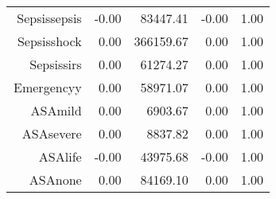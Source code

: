 \begin{tabular}{rrrrr}
$$  Sepsis\-sepsis & -0.00 & 83447.41 & -0.00 & 1.00 \\ 
  Sepsis\-shock & 0.00 & 366159.67 & 0.00 & 1.00 \\ 
  Sepsis\-sirs & 0.00 & 61274.27 & 0.00 & 1.00 \\ 
  Emergency\-y & 0.00 & 58971.07 & 0.00 & 1.00 \\ 
  ASA\-mild & 0.00 & 6903.67 & 0.00 & 1.00 \\ 
  ASA\-severe & 0.00 & 8837.82 & 0.00 & 1.00 \\ 
  ASA\-life & -0.00 & 43975.68 & -0.00 & 1.00 \\ 
  ASA\-none & 0.00 & 84169.10 & 0.00 & 1.00 \\ 
   \hline
\end{tabular}

